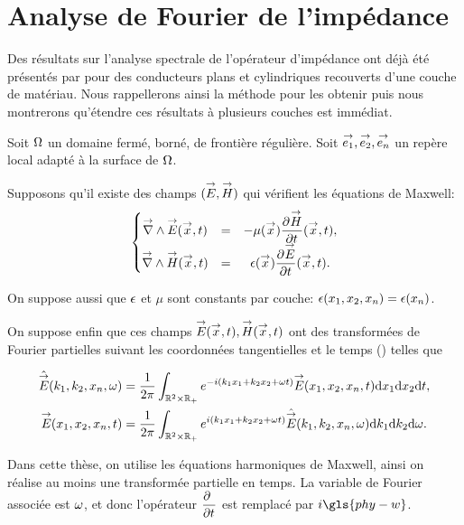 \section{Analyse de Fourier de l'impédance}

Des résultats sur l'analyse spectrale de l'opérateur d'impédance ont déjà été présentés par \cite{hoppe_impedance_1995} pour des conducteurs plans et cylindriques recouverts d'une couche de matériau.
Nous rappellerons ainsi la méthode pour les obtenir puis nous montrerons qu’étendre ces résultats à plusieurs couches est immédiat. 

Soit \(\OO\) un domaine fermé, borné, de frontière régulière. Soit \(\vect{e_1},\vect{e_2},\vect{e_n}\) un repère local adapté à la surface de \(\OO\).

Supposons qu'il existe des champs \((\vE,\vect H)\) qui vérifient les équations de Maxwell:
\begin{equation*}
    \left\lbrace
    \begin{matrix}
    \vrot \vE(\vect{x},t) &=& -\mu(\vx) \ddr{t}{\vect H}(\vx,t),
    \\
    \vrot \vect H(\vect{x},t) &=& \eps(\vx) \ddr{t}{\vE}(\vx,t).
    \end{matrix}
    \right.
\end{equation*}

On suppose aussi que \(\eps\) et \(\mu\) sont constants par couche: \(\eps(x_1,x_2,x_n)=\eps(x_n)\).

On suppose enfin que ces champs \(\vE(\vect{x},t),\vect H(\vect{x},t)\) ont des transformées de Fourier partielles suivant les coordonnées tangentielles et le temps
(\cite[Théorème de Plancherel, p.~153]{yosida_functional_1995}) telles que

\begin{align*}
    \hat{\vE} (k_1,k_2,x_n,\w) &= \frac{1}{2\pi}\int_{\RR^2\times\RR_+} e^{-i(k_1x_1+k_2x_2+\w t)}\vE(x_1,x_2,x_n,t) \dd{x_1}\dd{x_2}\dd{t},
    \\
    \vE(x_1,x_2,x_n,t) &= \frac{1}{2\pi}\int_{\RR^2\times\RR_+} e^{i(k_1x_1+k_2x_2+\w t)}\hat{\vE} (k_1,k_2,x_n,\w) \dd{k_1}\dd{k_2} \dd{\w}.
\end{align*}

Dans cette thèse, on utilise les équations harmoniques de Maxwell, ainsi on réalise au moins une transformée partielle en temps. La variable de Fourier associée est \(\w\), et donc l'opérateur \(\ddr{t}{~}\) est remplacé par \(i\gls{phy-w}\).

